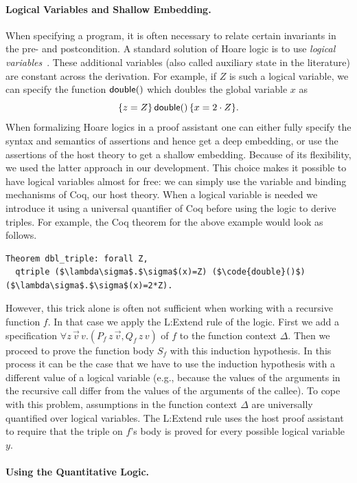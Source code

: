 \documentclass[nocopyrightspace,preprint,pldi]{sigplanconf-pldi15}
\begin{document}
{\paragraph{Logical Variables and Shallow Embedding.}

When specifying a program, it is often necessary to relate certain
invariants in the pre- and postcondition.  A standard solution of Hoare
logic is to use \emph{logical variables}~\cite{Kleymann99}.  These
additional variables (also called auxiliary state in the literature)
are constant across the derivation.  For example, if $Z$ is such
a logical variable, we can specify the function $\mathsf{double}()$
which doubles the global variable $x$ as
$$
  \{z = Z\}\, \mathsf{double}()\, \{x = 2 \cdot Z\}.
$$
%
When formalizing Hoare logics in a proof assistant one can either
fully specify the syntax and semantics of assertions and hence get a
deep embedding, or use the assertions of the host theory to get a
shallow embedding.  Because of its flexibility, we used the latter
approach in our development.  This choice makes it possible to have
logical variables almost for free: we can simply use the variable and
binding mechanisms of Coq, our host theory.  When a logical variable
is needed we introduce it using a universal quantifier of Coq before
using the logic to derive triples.  For example, the Coq theorem for
the above example would look as follows.
%
\begin{lstlisting}
Theorem dbl_triple: forall Z,
  qtriple ($\lambda\sigma$.$\sigma$(x)=Z) ($\code{double}()$) ($\lambda\sigma$.$\sigma$(x)=2*Z).
\end{lstlisting}
%
However, this trick alone is often not sufficient when working with a
recursive function $f$.  In that case we apply the {\sc L:Extend} rule
of the logic.  First we add a specification $\forall z\,\vec
v\,v.(P_f\,z\,\vec v, Q_f\,z\,v)$ of $f$ to the function context
$\Delta$.  Then we proceed to prove the function body $S_f$ with this
induction hypothesis.  In this process it can be the case that we have
to use the induction hypothesis with a different value of a logical
variable (e.g., because the values of the arguments in the recursive
call differ from the values of the arguments of the callee).  To cope
with this problem, assumptions in the function context $\Delta$ are
universally quantified over logical variables.  The {\sc L:Extend}
rule uses the host proof assistant to require that the triple on $f$'s
body is proved for every possible logical variable $y$.

\paragraph{Using the Quantitative Logic.}

}
\end{document}
